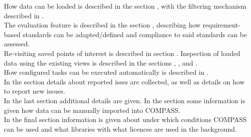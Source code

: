 How data can be loaded is described in the section , with the filtering mechanism described in . \\

The evaluation feature is described in the section , describing how requirement-based standards can be adapted/defined and compliance to said standards can be assessed. \\

Re-visiting saved points of interest is described in section . Inspection of loaded data using the existing views is described in the sections , ,  and . \\

How configured tasks can be executed automatically is described in . \\

In the section  details about reported isses are collected, as well as details on how to report new issues. \\

In the last section  additional details are given. In the section  some information is given how data can be manually imported into COMPASS. \\ 

In the final section  information is given about under which conditions COMPASS can be used and what libraries with what licences are used in the background.

\pagebreak



%








